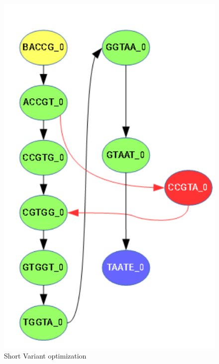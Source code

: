 \begin{figure}
	\centering
	\includegraphics{img/read-optimization.pdf}
	\caption{Short Variant optimization}
	\label{fig:read-optimization}
\end{figure}

